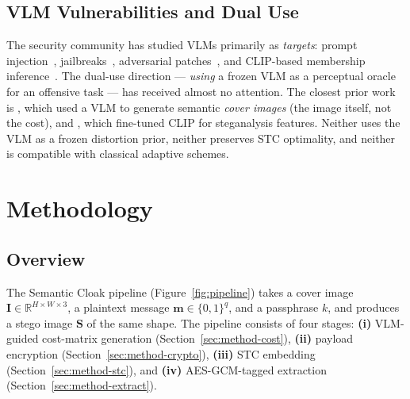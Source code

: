 \documentclass[10pt,a4paper]{article}
\newcommand{\R}{\mathbb{R}}
\newcommand{\cover}{\mathbf{I}}
\newcommand{\stego}{\mathbf{S}}
\newcommand{\msg}{\mathbf{m}}
\begin{document}
\subsection{VLM Vulnerabilities and Dual Use}
\label{sec:related-vlm}

The security community has studied VLMs primarily as
\emph{targets}: prompt injection~\cite{greshake2023prompt},
jailbreaks~\cite{wei2024jailbreak}, adversarial
patches~\cite{sharif2016patch}, and CLIP-based membership
inference~\cite{carlini2023membership}. The dual-use direction ---
\emph{using} a frozen VLM as a perceptual oracle for an offensive task
--- has received almost no attention. The closest prior work is
\cite{liu2024vlmstego}, which used a VLM to generate semantic
\emph{cover images} (the image itself, not the cost), and
\cite{yang2024clipsteg}, which fine-tuned CLIP for steganalysis
features. Neither uses the VLM as a frozen distortion prior, neither
preserves STC optimality, and neither is compatible with
classical adaptive schemes.

\section{Methodology}
\label{sec:method}

\subsection{Overview}
\label{sec:method-overview}

The Semantic Cloak pipeline (Figure~\ref{fig:pipeline}) takes a cover
image $\cover \in \R^{H \times W \times 3}$, a plaintext message
$\msg \in \{0,1\}^q$, and a passphrase $k$, and produces a stego image
$\stego$ of the same shape. The pipeline consists of four stages:
\textbf{(i)} VLM-guided cost-matrix generation
(Section~\ref{sec:method-cost}), \textbf{(ii)} payload encryption
(Section~\ref{sec:method-crypto}), \textbf{(iii)} STC embedding
(Section~\ref{sec:method-stc}), and \textbf{(iv)} AES-GCM-tagged
extraction (Section~\ref{sec:method-extract}).
\end{document}
